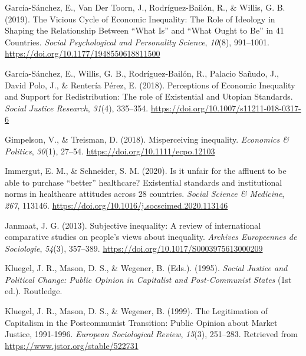 \documentclass[
  12pt,
]{article}
\newlength{\cslhangindent}
\newenvironment{CSLReferences}[2] %
 {\begin{list}{}{%
  \setlength{\itemindent}{0pt}
  \setlength{\leftmargin}{0pt}
  \setlength{\parsep}{0pt}
  \ifodd #1
   \setlength{\leftmargin}{\cslhangindent}
   \setlength{\itemindent}{-1\cslhangindent}
  \fi
  \setlength{\itemsep}{#2\baselineskip}}}
 {\end{list}}
\begin{document}
\begin{CSLReferences}{1}{0}
García-Sánchez, E., Van Der Toorn, J., Rodríguez-Bailón, R., \& Willis,
G. B. (2019). The {Vicious Cycle} of {Economic Inequality}: {The Role}
of {Ideology} in {Shaping} the {Relationship Between} {``{What Is}''}
and {``{What Ought} to {Be}''} in 41 {Countries}. \emph{Social
Psychological and Personality Science}, \emph{10}(8), 991--1001.
\url{https://doi.org/10.1177/1948550618811500}

García-Sánchez, E., Willis, G. B., Rodríguez-Bailón, R., Palacio Sañudo,
J., David Polo, J., \& Rentería Pérez, E. (2018). Perceptions of
{Economic Inequality} and {Support} for {Redistribution}: {The} role of
{Existential} and {Utopian Standards}. \emph{Social Justice Research},
\emph{31}(4), 335--354. \url{https://doi.org/10.1007/s11211-018-0317-6}

Gimpelson, V., \& Treisman, D. (2018). Misperceiving inequality.
\emph{Economics \& Politics}, \emph{30}(1), 27--54.
\url{https://doi.org/10.1111/ecpo.12103}

Immergut, E. M., \& Schneider, S. M. (2020). Is it unfair for the
affluent to be able to purchase {``better''} healthcare? {Existential}
standards and institutional norms in healthcare attitudes across 28
countries. \emph{Social Science \& Medicine}, \emph{267}, 113146.
\url{https://doi.org/10.1016/j.socscimed.2020.113146}

Janmaat, J. G. (2013). Subjective inequality: {A} review of
international comparative studies on people's views about inequality.
\emph{Archives Europeennes de Sociologie}, \emph{54}(3), 357--389.
\url{https://doi.org/10.1017/S0003975613000209}

Kluegel, J. R., Mason, D. S., \& Wegener, B. (Eds.). (1995).
\emph{Social {Justice} and {Political Change}: {Public Opinion} in
{Capitalist} and {Post-Communist States}} (1st ed.). Routledge.

Kluegel, J. R., Mason, D. S., \& Wegener, B. (1999). The {Legitimation}
of {Capitalism} in the {Postcommunist Transition}: {Public Opinion}
about {Market Justice}, 1991-1996. \emph{European Sociological Review},
\emph{15}(3), 251--283. Retrieved from
\url{https://www.jstor.org/stable/522731}


\end{CSLReferences}
\end{document}

